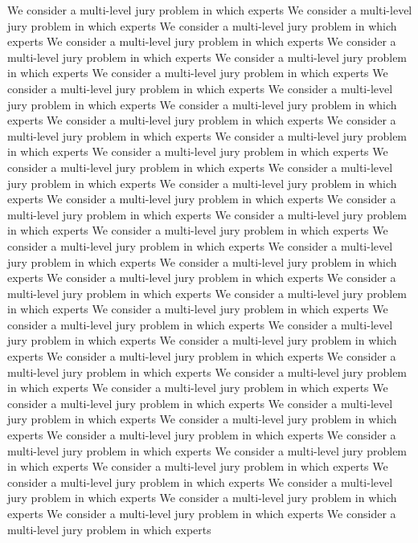 \documentclass[letterpaper]{article} %
\begin{document}
We consider a multi-level jury problem in which experts
We consider a multi-level jury problem in which experts
We consider a multi-level jury problem in which experts
We consider a multi-level jury problem in which experts
We consider a multi-level jury problem in which experts
We consider a multi-level jury problem in which experts
We consider a multi-level jury problem in which experts
We consider a multi-level jury problem in which experts
We consider a multi-level jury problem in which experts
We consider a multi-level jury problem in which experts
We consider a multi-level jury problem in which experts
We consider a multi-level jury problem in which experts
We consider a multi-level jury problem in which experts
We consider a multi-level jury problem in which experts
We consider a multi-level jury problem in which experts
We consider a multi-level jury problem in which experts
We consider a multi-level jury problem in which experts
We consider a multi-level jury problem in which experts
We consider a multi-level jury problem in which experts
We consider a multi-level jury problem in which experts
We consider a multi-level jury problem in which experts
We consider a multi-level jury problem in which experts
We consider a multi-level jury problem in which experts
We consider a multi-level jury problem in which experts
We consider a multi-level jury problem in which experts
We consider a multi-level jury problem in which experts
We consider a multi-level jury problem in which experts
We consider a multi-level jury problem in which experts
We consider a multi-level jury problem in which experts
We consider a multi-level jury problem in which experts
We consider a multi-level jury problem in which experts
We consider a multi-level jury problem in which experts
We consider a multi-level jury problem in which experts
We consider a multi-level jury problem in which experts
We consider a multi-level jury problem in which experts
We consider a multi-level jury problem in which experts
We consider a multi-level jury problem in which experts
We consider a multi-level jury problem in which experts
We consider a multi-level jury problem in which experts
We consider a multi-level jury problem in which experts
We consider a multi-level jury problem in which experts
We consider a multi-level jury problem in which experts
We consider a multi-level jury problem in which experts
We consider a multi-level jury problem in which experts
We consider a multi-level jury problem in which experts
We consider a multi-level jury problem in which experts
We consider a multi-level jury problem in which experts
\end{document}
